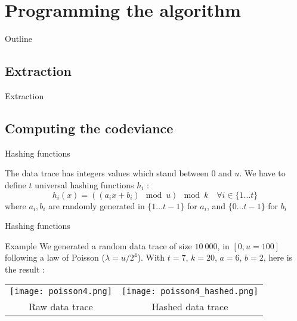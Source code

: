 \documentclass[mathserif]{beamer}
\begin{document}
\section{Programming the algorithm}

	\begin{frame}{Outline}
		\tableofcontents[currentsection]
	\end{frame}

	\subsection{Extraction}
	
	\begin{frame}{Extraction}
	\end{frame}
	
	\subsection{Computing the codeviance}
	
	\begin{frame}{Hashing functions}
	
	\begin{block}{}
	The data trace has integers values which stand between $0$ and $u$. We have to define $t$ universal hashing functions $h_i$ :
	\[ h_i(x) = ((a_ix+b_i) \mod u) \mod k \quad \forall i \in \lbrace 1 \ldots t \rbrace \]
where $a_i, b_i$ are randomly generated in $\lbrace 1 \dots t-1 \rbrace$ for $a_i$, and $\lbrace 0 \ldots t-1 \rbrace$ for $b_i$
	\end{block}
	
	\end{frame}
	
	\begin{frame}{Hashing functions}
	
	\begin{exampleblock}{Example}
	We generated a random data trace of size $10~000$, in $\left[0, u = 100\right]$ following a law of Poisson ($\lambda = u/2^4$). With $t=7$, $k=20$, $a=6$, $b=2$, here is the result :
	
	\begin{center}
	\begin{tabular}{cc}
		\texttt{[image: poisson4.png]} &
		\texttt{[image: poisson4\_hashed.png]} \\
		Raw data trace & Hashed data trace \\
	\end{tabular}
	\end{center}
	
	\end{exampleblock}

	\end{frame}
	
\end{document}
